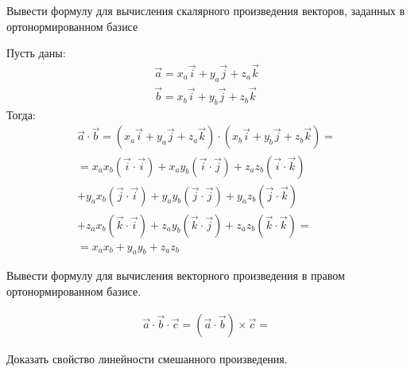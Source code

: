 \begin{question}
  Вывести формулу для вычисления скалярного произведения векторов, заданных в ортонормированном базисе
\end{question}
\begin{answer}
  Пусть даны:
  \begin{gather*}
    \vec{a} = x_a \vec{i} + y_a \vec{j} + z_a \vec{k} \\
    \vec{b} = x_b \vec{i} + y_b \vec{j} + z_b \vec{k}
  \end{gather*}
  Тогда:
  \begin{gather*}
    \vec{a} \cdot \vec{b} = \left( x_a \vec{i} + y_a \vec{j} + z_a \vec{k} \right) \cdot \left( x_b \vec{i} + y_b \vec{j} + z_b \vec{k} \right) = \\
    = x_a x_b (\vec{i} \cdot \vec{i}) + x_a y_b (\vec{i} \cdot \vec{j}) + z_a z_b (\vec{i} \cdot \vec{k}) \\
    + y_a x_b (\vec{j} \cdot \vec{i}) + y_a y_b (\vec{j} \cdot \vec{j}) + y_a z_b (\vec{j} \cdot \vec{k}) \\
    + z_a x_b (\vec{k} \cdot \vec{i}) + z_a y_b (\vec{k} \cdot \vec{j}) + z_a z_b (\vec{k} \cdot \vec{k}) = \\
    = x_a x_b + y_a y_b + z_a z_b
  \end{gather*}
\end{answer}


\begin{question}
  Вывести формулу для вычисления векторного произведения в правом ортонормированном базисе.
\end{question}
\begin{answer}
  \begin{gather*}
    \vec{a} \cdot \vec{b} \cdot \vec{c} = \left( \vec{a} \cdot \vec{b} \right) \times \vec{c} =
  \end{gather*}
\end{answer}

\begin{question}
  Доказать свойство линейности смешанного произведения.
\end{question}

